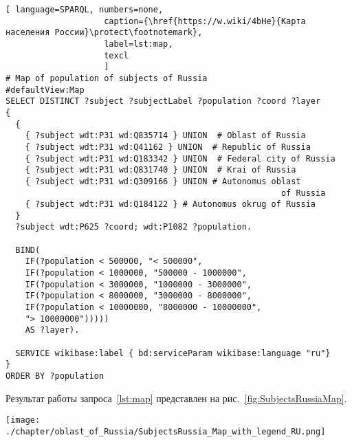 \begin{lstlisting}[ language=SPARQL, numbers=none,
                    caption={\href{https://w.wiki/4bHe}{Карта населения России}\protect\footnotemark},
                    label=lst:map,
                    texcl 
                    ]
# Map of population of subjects of Russia
#defaultView:Map
SELECT DISTINCT ?subject ?subjectLabel ?population ?coord ?layer
{
  {
    { ?subject wdt:P31 wd:Q835714 } UNION  # Oblast of Russia
    { ?subject wdt:P31 wd:Q41162 } UNION  # Republic of Russia
    { ?subject wdt:P31 wd:Q183342 } UNION  # Federal city of Russia
    { ?subject wdt:P31 wd:Q831740 } UNION  # Krai of Russia
    { ?subject wdt:P31 wd:Q309166 } UNION # Autonomus oblast 
                                                        of Russia
    { ?subject wdt:P31 wd:Q184122 } # Autonomus okrug of Russia
  }   
  ?subject wdt:P625 ?coord; wdt:P1082 ?population.
  
  BIND(
    IF(?population < 500000, "< 500000",
    IF(?population < 1000000, "500000 - 1000000",
    IF(?population < 3000000, "1000000 - 3000000",
    IF(?population < 8000000, "3000000 - 8000000",
    IF(?population < 10000000, "8000000 - 10000000",
    "> 10000000")))))
    AS ?layer).
  
  SERVICE wikibase:label { bd:serviceParam wikibase:language "ru"}
}
ORDER BY ?population
\end{lstlisting}%

Результат работы запроса~\ref{lst:map} представлен на рис.~\ref{fig:SubjectsRussiaMap}.

\begin{fullwidth}
\begin{figure*}[h]
	\texttt{[image: ./chapter/oblast\_of\_Russia/SubjectsRussia\_Map\_with\_legend\_RU.png]}
	\caption[Карта численности населения по субъектам России, 2021 год.]{Карта численности населения по субъектам России, 2021 год. Субъекты разделёны на шесть групп по количеству населения и отмечены разными цветами в зависимости от группы, в которую субъект входит. Карта построена с помощью запроса~\protect\ref{lst:map}.}%
      \label{fig:SubjectsRussiaMap}%
\end{figure*} 
\end{fullwidth}

